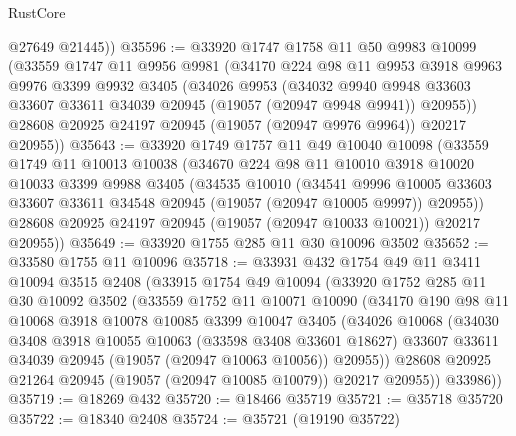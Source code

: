 \begin{lexlean}{RustCore}
\begin{coremodule}
        @27649
        @21445))
@35596 := @33920
    @1747
    @1758
    @11
    @50
    @9983
    @10099
    (@33559
      @1747
      @11
      @9956
      @9981
      (@34170
        @224
        @98
        @11
        @9953
        @3918
        @9963
        @9976
        @3399
        @9932
        @3405
        (@34026
          @9953
          (@34032
            @9940
            @9948
            @33603
            @33607
            @33611
            @34039
            @20945
            (@19057 (@20947 @9948 @9941))
            @20955))
        @28608
        @20925
        @24197
        @20945
        (@19057 (@20947 @9976 @9964))
        @20217
        @20955))
@35643 := @33920
    @1749
    @1757
    @11
    @49
    @10040
    @10098
    (@33559
      @1749
      @11
      @10013
      @10038
      (@34670
        @224
        @98
        @11
        @10010
        @3918
        @10020
        @10033
        @3399
        @9988
        @3405
        (@34535
          @10010
          (@34541
            @9996
            @10005
            @33603
            @33607
            @33611
            @34548
            @20945
            (@19057 (@20947 @10005 @9997))
            @20955))
        @28608
        @20925
        @24197
        @20945
        (@19057 (@20947 @10033 @10021))
        @20217
        @20955))
@35649 := @33920 @1755 @285 @11 @30 @10096 @3502
@35652 := @33580 @1755 @11 @10096
@35718 := @33931
    @432
    @1754
    @49
    @11
    @3411
    @10094
    @3515
    @2408
    (@33915
      @1754
      @49
      @10094
      (@33920
        @1752
        @285
        @11
        @30
        @10092
        @3502
        (@33559
          @1752
          @11
          @10071
          @10090
          (@34170
            @190
            @98
            @11
            @10068
            @3918
            @10078
            @10085
            @3399
            @10047
            @3405
            (@34026
              @10068
              (@34030
                @3408
                @3918
                @10055
                @10063
                (@33598 @3408 @33601 @18627)
                @33607
                @33611
                @34039
                @20945
                (@19057 (@20947 @10063 @10056))
                @20955))
            @28608
            @20925
            @21264
            @20945
            (@19057 (@20947 @10085 @10079))
            @20217
            @20955))
        @33986))
@35719 := @18269 @432
@35720 := @18466 @35719
@35721 := @35718 @35720
@35722 := @18340 @2408
@35724 := @35721 (@19190 @35722)

\end{coremodule}
\end{lexlean}
